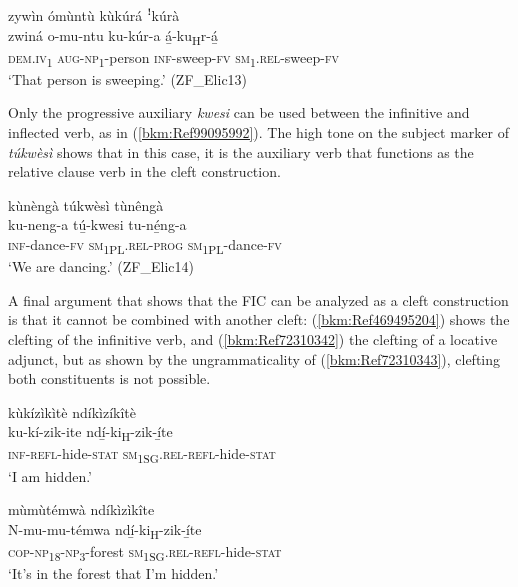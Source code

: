 \ea
\label{bkm:Ref442188158}
zywìn ómùntù kùkúrá ꜝkúrà\\
\gll zwiná    o-mu-ntu    ku-kúr-a    á̲-ku\textsubscript{H}r-á̲\\
\textsc{dem}.\textsc{iv}\textsubscript{1}  \textsc{aug}-\textsc{np}\textsubscript{1}-person  \textsc{inf}-sweep-\textsc{fv}  \textsc{sm}\textsubscript{1}.\textsc{rel}-sweep-\textsc{fv}\\
\glt ‘That person is sweeping.’ (ZF\_Elic13)
\z

Only the progressive auxiliary \textit{kwesi} can be used between the infinitive and inflected verb, as in (\ref{bkm:Ref99095992}). The high tone on the subject marker of \textit{túkwèsì} shows that in this case, it is the auxiliary verb that functions as the relative clause verb in the cleft construction.

\ea
\label{bkm:Ref99095992}
kùnèngà túkwèsì tùnêngà\\
\gll ku-neng-a    tú̲-kwesi    tu-né̲ng-a\\
\textsc{inf}-dance-\textsc{fv}  \textsc{sm}\textsubscript{1PL}.\textsc{rel}-\textsc{prog}  \textsc{sm}\textsubscript{1PL}-dance-\textsc{fv}\\
\glt ‘We are dancing.’ (ZF\_Elic14)
\z

A final argument that shows that the FIC can be analyzed as a cleft construction is that it cannot be combined with another cleft: (\ref{bkm:Ref469495204}) shows the clefting of the infinitive verb, and (\ref{bkm:Ref72310342}) the clefting of a locative adjunct, but as shown by the ungrammaticality of (\ref{bkm:Ref72310343}), clefting both constituents is not possible.

\ea
kùkízìkìtè ndíkìzíkîtè\\
\gll ku-kí-zik-ite      ndí̲-ki\textsubscript{H}-zik-í̲te\\
\textsc{inf}-\textsc{refl}-hide-\textsc{stat}  \textsc{sm}\textsubscript{1SG}.\textsc{rel}-\textsc{refl}-hide-\textsc{stat}\\
\glt ‘I am hidden.’
\z

\ea
\label{bkm:Ref72310342}
mùmùtémwà ndíkìzìkîte\\
\gll N-mu-mu-témwa    ndí̲-ki\textsubscript{H}-zik-í̲te\\
\textsc{cop}-\textsc{np}\textsubscript{18}-\textsc{np}\textsubscript{3}-forest  \textsc{sm}\textsubscript{1SG\-\-}.\textsc{rel}-\textsc{refl}-hide-\textsc{stat}\\
\glt ‘It’s in the forest that I’m hidden.’
\z

